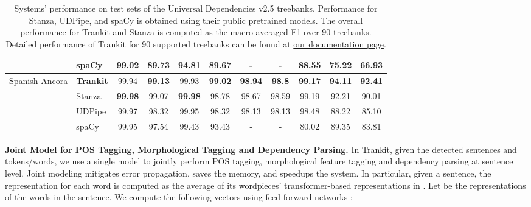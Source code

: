 \documentclass[11pt,a4paper]{article}
\begin{document}
\begin{table*}[ht]
{\begin{tabular}{l|l|c|c|c|c|c|c|c|c|c}
                                        & spaCy   & 99.02                               & 89.73                               & 94.81                               & 89.67                               & -                                   & -                                   & 88.55                               & 75.22                               & 66.93                               \\ \hline
\multirow{4}{*}{Spanish-Ancora}         & {\bf Trankit}                     & 99.94          & \textbf{99.13} & 99.93          & \textbf{99.02} & \textbf{98.94} & \textbf{98.8}  & \textbf{99.17} & \textbf{94.11} & \textbf{92.41} \\ \cline{2-11} 
                                        & Stanza                      & \textbf{99.98} & 99.07          & \textbf{99.98} & 98.78          & 98.67          & 98.59          & 99.19          & 92.21          & 90.01          \\ \cline{2-11} 
                                        & UDPipe                      & 99.97          & 98.32          & 99.95          & 98.32          & 98.13          & 98.13          & 98.48          & 88.22          & 85.10          \\ \cline{2-11} 
                                        & spaCy                       & 99.95          & 97.54          & 99.43          & 93.43          & -              & -              & 80.02          & 89.35          & 83.81          \\ \end{tabular}}

\caption{Systems' performance on test sets of the Universal Dependencies v2.5 treebanks. Performance for Stanza, UDPipe, and spaCy is obtained using their public pretrained models. The overall performance for Trankit and Stanza is computed as the macro-averaged F1 over 90 treebanks. Detailed performance of Trankit for 90 supported treebanks can be found at \href{https://trankit.readthedocs.io/en/latest/performance.html}{our documentation page}.}
\label{tab:ud-performance}
\end{table*}







\vspace{0.3cm}

\noindent \textbf{Joint Model for POS Tagging, Morphological Tagging and Dependency Parsing.} In Trankit, given the detected sentences and tokens/words, we use a single model to jointly perform POS tagging, morphological feature tagging and dependency parsing at sentence level. Joint modeling mitigates error propagation, saves the memory, and speedups the system. In particular, given a sentence, the representation for each word is computed as the average of its wordpieces' transformer-based representations in . Let  be the representations of the words in the sentence. We compute the following vectors using feed-forward networks :
\end{document}
